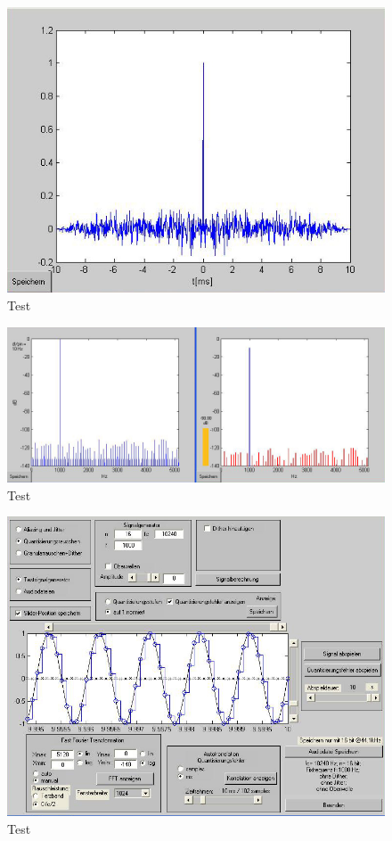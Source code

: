 \begin{figure}[h!]
\centering
\includegraphics[width=\columnwidth]{figures/Aufg1/2_1_korr.JPG} 
\caption{Test}
\end{figure}

\begin{figure}[h!]
\centering
\includegraphics[width=\columnwidth]{figures/Aufg1/2_2_fenster_ok.JPG} 
\caption{Test}
\end{figure}

\begin{figure}[h!]
\centering
\includegraphics[width=\columnwidth]{figures/Aufg1/2_2_fenster_ok_einstell.JPG} 
\caption{Test}
\end{figure}

